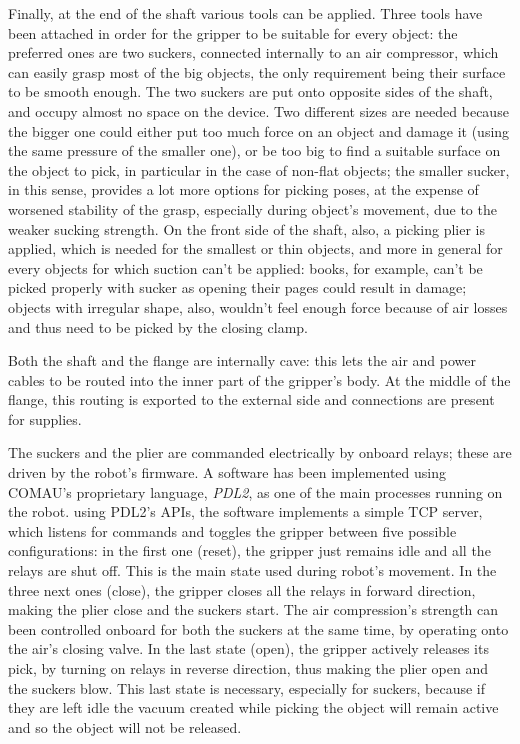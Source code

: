 Finally, at the end of the shaft various tools can be applied. Three
tools have been attached in order for the gripper to be suitable for every
object: the preferred ones are two suckers, connected internally to an air
compressor, which can easily grasp most of the big objects, the only
requirement being their surface to be smooth enough. The two suckers are put
onto opposite sides of the shaft, and occupy almost no space on the device. Two
different sizes are needed because  the bigger one could either put too much
force on an object and damage it (using the same pressure of the smaller one),
or be too big to find a suitable surface on the object to pick, in particular
in the case of non-flat objects; the smaller sucker, in this sense, provides a
lot more options for picking poses, at the expense of worsened stability of
the grasp, especially during object's movement, due to the weaker sucking
strength. On the front side of the shaft, also, a picking plier is applied,
which is needed for the smallest or thin objects, and more in general for
every objects for which suction can't be applied: books, for example, can't be
picked properly with sucker as opening their pages could result in damage;
objects with irregular shape, also, wouldn't feel enough force because of air
losses and thus need to be picked by the closing clamp.

Both the shaft and the flange are internally cave: this lets the air and power
cables to be routed into the inner part of the gripper's body. At the middle of
the flange, this routing is exported to the external side and connections are
present for supplies.

The suckers and the plier are commanded electrically by onboard relays; these
are driven by the robot's firmware. A software has been implemented using
COMAU's proprietary language, \emph{PDL2}, as one of the main processes running on the
robot. using PDL2's APIs, the software implements a simple TCP server, which
listens for commands and toggles the gripper between five possible
configurations: in the first one (reset), the gripper just remains idle and all
the relays are shut off. This is the main state used during robot's
movement. In the three next ones (close), the gripper closes all the relays
in forward direction, making the plier close and the suckers start. The air
compression's strength can been controlled onboard for both the suckers at the
same time, by operating onto the air's closing valve. In the last state (open),
the gripper actively releases its pick, by turning on relays in reverse
direction, thus making the plier open and the suckers blow. This last state  is
necessary, especially for suckers, because if they are left idle the vacuum
created while picking the object will remain active and so the object will not
be released.

